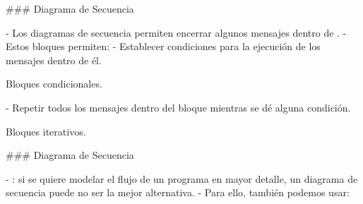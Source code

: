 
### Diagrama de Secuencia


- Los diagramas de secuencia permiten encerrar algunos mensajes dentro de .
- Estos bloques permiten:
    - Establecer condiciones para la ejecución de los mensajes dentro de él.
        \begin{rboxx}{}
        Bloques condicionales.
        \end{rboxx}
    - Repetir todos los mensajes dentro del bloque mientras se dé alguna condición.
        \begin{rboxx}{}
        Bloques iterativos.
        \end{rboxx}

### Diagrama de Secuencia


- : si se quiere modelar el flujo de un programa en mayor detalle, un diagrama de secuencia
puede no ser la mejor alternativa.
    - Para ello, también podemos usar:

